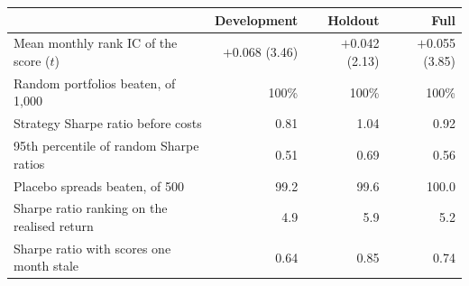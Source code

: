 \begin{tabular}{@{}lrrr@{}}
\toprule
 & Development & Holdout & Full \\
\midrule
Mean monthly rank IC of the score ($t$) & $+$0.068 (3.46) & $+$0.042 (2.13) & $+$0.055 (3.85) \\
Random portfolios beaten, of 1,000 & 100\% & 100\% & 100\% \\
Strategy Sharpe ratio before costs & 0.81 & 1.04 & 0.92 \\
95th percentile of random Sharpe ratios & 0.51 & 0.69 & 0.56 \\
Placebo spreads beaten, of 500 & 99.2 & 99.6 & 100.0 \\
Sharpe ratio ranking on the realised return & 4.9 & 5.9 & 5.2 \\
Sharpe ratio with scores one month stale & 0.64 & 0.85 & 0.74 \\
\bottomrule
\end{tabular}
